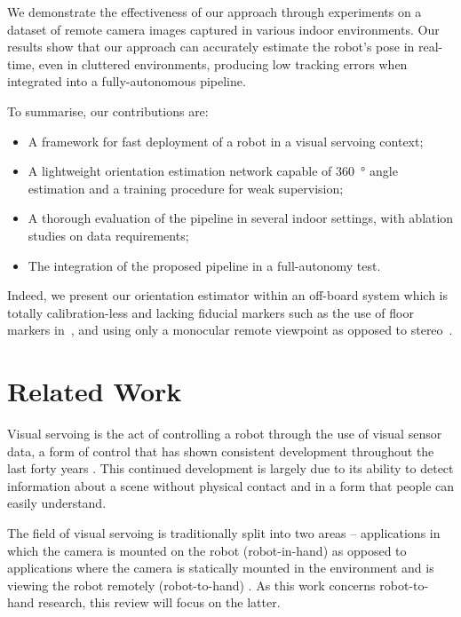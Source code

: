 \documentclass[conference]{ieeeconf}
\begin{document}
We demonstrate the effectiveness of our approach through experiments on a dataset of remote camera images captured in various indoor environments.
Our results show that our approach can accurately estimate the robot's pose in real-time, even in cluttered environments, producing low tracking errors when integrated into a fully-autonomous pipeline.

To summarise, our contributions are:
\begin{itemize}
\item A framework for fast deployment of a robot in a visual servoing context;
\item A lightweight orientation estimation network capable of \SI{360}{\degree} angle estimation and a training procedure for weak supervision;
\item A thorough evaluation of the pipeline in several indoor settings, with ablation studies on data requirements;
\item The integration of the proposed pipeline in a full-autonomy test.
\end{itemize}

Indeed, we present our orientation estimator within an off-board system which is totally calibration-less and lacking fiducial markers such as the use of floor markers in~\cite{shim2016mobile}, and using only a monocular remote viewpoint as opposed to stereo~\cite{flogel2022infrastructure}.

\section{Related Work}%
\label{sec:literature}

Visual servoing is the act of controlling a robot through the use of visual sensor data, a form of control that has shown consistent development throughout the last forty years \cite{agin1980computer}.
This continued development is largely due to its ability to detect information about a scene without physical contact and in a form that people can easily understand.

The field of visual servoing is traditionally split into two areas -- applications in which the camera is mounted on the robot (robot-in-hand) as opposed to applications where the camera is statically mounted in the environment and is viewing the robot remotely (robot-to-hand) \cite{flandin2000eye}.
As this work concerns robot-to-hand research, this review will focus on the latter.
\end{document}
